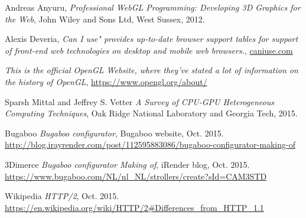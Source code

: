 
\begin{thebibliography}{9}

  Andreas Anyuru,
  \emph{Professional WebGL Programming: Developing 3D Graphics for the Web},
  John Wiley and Sons Ltd, West Sussex,
  2012.
  
  Alexis Deveria,
  \emph{Can I use" provides up-to-date browser support tables for support of front-end web technologies on desktop and mobile web browsers.},
  \url{caniuse.com}
  
	\emph{This is the official OpenGL Website, where they've stated a lot of information on the history of OpenGL},
	\url{https://www.opengl.org/about/}
	
	Sparsh Mittal and Jeffrey S. Vetter
	\emph{A Survey of CPU-GPU Heterogeneous Computing Techniques},
	Oak Ridge National Laboratory and Georgia Tech,
	2015.
	
	Bugaboo
	\emph{Bugaboo configurator},
	Bugaboo website,
	Oct. 2015.
	\url{http://blog.irayrender.com/post/112595883086/bugaboo-configurator-making-of}
	
	3Dimerce
	\emph{Bugaboo configurator Making of},
	iRender blog,
	Oct. 2015.
	\url{https://www.bugaboo.com/NL/nl_NL/strollers/create?sId=CAM3STD}
	
	Wikipedia
	\emph{HTTP/2},
	Oct. 2015.
	\url{https://en.wikipedia.org/wiki/HTTP/2#Differences_from_HTTP_1.1}

\end{thebibliography}